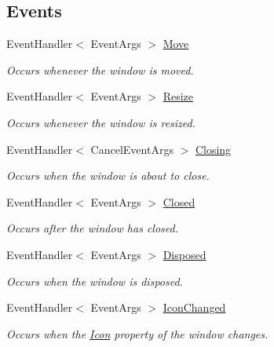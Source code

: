 \subsection*{Events}
\begin{DoxyCompactItemize}
\item 
Event\-Handler$<$ Event\-Args $>$ \hyperlink{interface_open_t_k_1_1_i_native_window_aa2a9b872e56a47dc3f11dcd0078e1ced}{Move}
\begin{DoxyCompactList}\small\item\em Occurs whenever the window is moved. \end{DoxyCompactList}\item 
Event\-Handler$<$ Event\-Args $>$ \hyperlink{interface_open_t_k_1_1_i_native_window_afd40870500a57eda076033f4c401ec4c}{Resize}
\begin{DoxyCompactList}\small\item\em Occurs whenever the window is resized. \end{DoxyCompactList}\item 
Event\-Handler$<$ Cancel\-Event\-Args $>$ \hyperlink{interface_open_t_k_1_1_i_native_window_a8404d9d6adb118c52c1e329e8a331d52}{Closing}
\begin{DoxyCompactList}\small\item\em Occurs when the window is about to close. \end{DoxyCompactList}\item 
Event\-Handler$<$ Event\-Args $>$ \hyperlink{interface_open_t_k_1_1_i_native_window_a2ecfca5308b3f11c83ef15011f4a96de}{Closed}
\begin{DoxyCompactList}\small\item\em Occurs after the window has closed. \end{DoxyCompactList}\item 
Event\-Handler$<$ Event\-Args $>$ \hyperlink{interface_open_t_k_1_1_i_native_window_a7e983e4b600c3e3805a693957f4b8a75}{Disposed}
\begin{DoxyCompactList}\small\item\em Occurs when the window is disposed. \end{DoxyCompactList}\item 
Event\-Handler$<$ Event\-Args $>$ \hyperlink{interface_open_t_k_1_1_i_native_window_a968bcf8310e87cee07e85eb9629da874}{Icon\-Changed}
\begin{DoxyCompactList}\small\item\em Occurs when the \hyperlink{interface_open_t_k_1_1_i_native_window_a16cffc51a5dd62c9d9dbf9a089620754}{Icon} property of the window changes. \end{DoxyCompactList}\item 

\end{DoxyCompactItemize}
